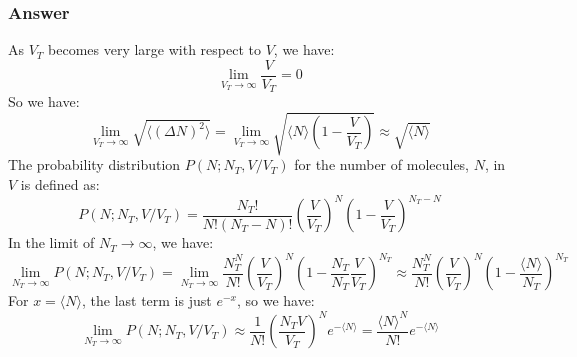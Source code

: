 \documentclass{article}
\begin{document}
\subsubsection{Answer}
As $V_T$ becomes very large with respect to $V$, we have:
\begin{equation}
    \lim_{V_T \to \infty} \frac{V}{V_T} = 0
\end{equation}
So we have:
\begin{equation}
    \lim_{V_T \to \infty} \sqrt{\langle (\Delta N)^2 \rangle} = \lim_{V_T \to \infty} \sqrt{\langle N \rangle \left(1 - \frac{V}{V_T}\right)} \approx \sqrt{\langle N \rangle}
\end{equation}
The probability distribution \( P(N; N_T, V/V_T) \) for the number of molecules, \( N \), in \( V \) is defined as:
\begin{equation}
    P(N; N_T, V/V_T) = \frac{N_T!}{N! (N_T - N)!} \left(\frac{V}{V_T}\right)^N \left(1 - \frac{V}{V_T}\right)^{N_T - N}
\end{equation}
In the limit of $N_T \to \infty$, we have:
\begin{equation}
    \lim_{N_T \to \infty} P(N; N_T, V/V_T) = \lim_{N_T \to \infty} \frac{N_T^N}{N!} \left(\frac{V}{V_T}\right)^N \left(1 - \frac{N_T}{N_T} \frac{V}{V_T}\right)^{N_T} \approx \frac{N_T^N}{N!} \left(\frac{V}{V_T}\right)^N \left(1 - \frac{\langle N \rangle}{N_T}\right)^{N_T}
\end{equation}
For $x=\langle N \rangle $, the last term is just $e^{-x}$, so we have:
\begin{equation}
    \lim_{N_T \to \infty} P(N; N_T, V/V_T) \approx \frac{1}{N!} \left(\frac{N_TV}{V_T}\right)^N e^{-\langle N \rangle} = \boxed{\frac{\langle N \rangle^N}{N!} e^{-\langle N \rangle}}
\end{equation}
\end{document}
